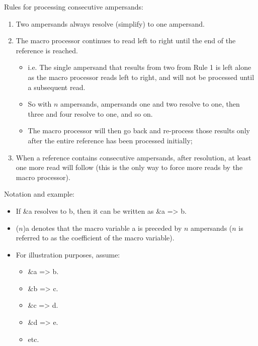 \documentclass[11pt, oneside]{article}
\begin{document}
Rules for processing consecutive ampersands:
\begin{enumerate}
\item Two ampersands always resolve (simplify) to one ampersand.
\item The macro processor continues to read left to right until the end of the reference is reached.
	\begin{itemize}
	\item i.e. The single ampersand that results from two from Rule 1 is left alone as the macro processor reads left to right, and will not be processed until a subsequent read.
	\item So with $n$ ampersands, ampersands one and two resolve to one, then three and four resolve to one, and so on.
	\item The macro processor will then go back and re-process those results only after the entire reference has been processed initially;
	\end{itemize}
\item When a reference contains consecutive ampersands, after resolution, at least one more read will follow (this is the only way to force more reads by the macro processor).
\end{enumerate}

Notation and example:
\begin{itemize}
\item If \&a resolves to b, then it can be written as \&a => b.
\item ($n$)a denotes that the macro variable a is preceded by $n$ ampersands ($n$ is referred to as the coefficient of the macro variable).
\item For illustration purposes, assume:
	\begin{itemize}
	\item \&a => b.
	\item \&b => c.
	\item \&c => d.
	\item \&d => e.
	\item etc.
	\end{itemize}
\end{itemize}
	
\end{document}

